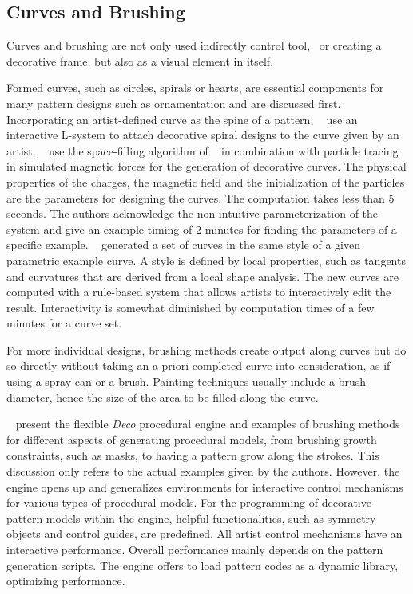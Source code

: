 

\subsection{Curves and Brushing}
\label{subsec:analysis_curves}

Curves and brushing are not only used indirectly control tool, \eg~or creating a decorative frame, but also as a visual element in itself. 

Formed curves, such as circles, spirals or hearts, are essential components for many pattern designs such as ornamentation and are discussed first. Incorporating an artist-defined curve as the spine of a pattern, \citeauthor*{yu_2012_ans}~\cite{yu_2012_ans} use an interactive L-system to attach decorative spiral designs to the curve given by an artist. \citeauthor*{xu_2009_mcc}~\cite{xu_2009_mcc} use the space-filling algorithm of \citeauthor*{wong_1998_cgf}~\cite{wong_1998_cgf} in combination with particle tracing in simulated magnetic forces for the generation of decorative curves. The physical properties of the charges, the magnetic field and the initialization of the particles are the parameters for designing the curves. The computation takes less than 5 seconds. The authors acknowledge the non-intuitive parameterization of the system and give an example timing of 2 minutes for finding the parameters of a specific example. \citeauthor*{merrell_2010_ecs}~\cite{merrell_2010_ecs} generated a set of curves in the same style of a given parametric example curve. A style is defined by local properties, such as tangents and curvatures that are derived from a local shape analysis. The new curves are computed with a rule-based system that allows artists to interactively edit the result. Interactivity is somewhat diminished by computation times of a few minutes for a curve set.

For more individual designs, brushing methods create output along curves but do so directly without taking an a priori completed curve into consideration, as if using a spray can or a brush. Painting techniques usually include a brush diameter, hence the size of the area to be filled along the curve. 

\citeauthor*{mech_2012_tdf}~\cite{mech_2012_tdf} present the flexible \textit{Deco} procedural engine and examples of brushing methods for different aspects of generating procedural models, from brushing growth constraints, such as masks, to having a pattern grow along the strokes. This discussion only refers to the actual examples given by the authors. However, the engine opens up and generalizes environments for interactive control mechanisms for various types of procedural models. For the programming of decorative pattern models within the engine, helpful functionalities, such as symmetry objects and control guides, are predefined. All artist control mechanisms have an interactive performance. Overall performance mainly depends on the pattern generation scripts. The engine offers to load pattern codes as a dynamic library, optimizing performance. 

